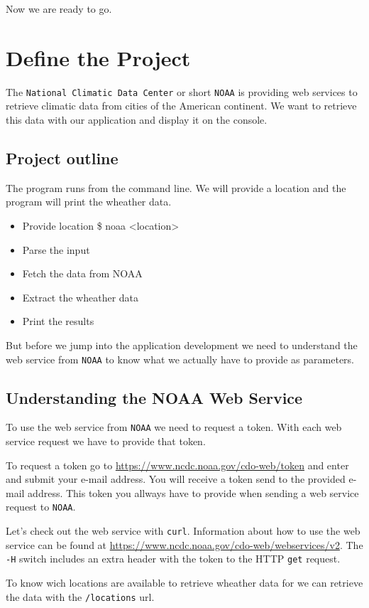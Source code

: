 \documentclass[10pt, a4paper]{article}
\begin{document}
Now we are ready to go.

\section{Define the Project}
The \texttt{National Climatic Data Center} or short \texttt{NOAA} is providing
web services to retrieve climatic data from cities of the American continent.
We want to retrieve this data with our application and display it on the
console.

\subsection{Project outline}
The program runs from the command line. We will provide a location and the
program will print the wheather data.

\begin{itemize}
  \item Provide location \$ noaa <location>
  \item Parse the input
  \item Fetch the data from NOAA
  \item Extract the wheather data
  \item Print the results
\end{itemize}

But before we jump into the application development we need to understand the
web service from \texttt{NOAA} to know what we actually have to provide as
parameters.

\subsection{Understanding the NOAA Web Service}
To use the web service from \texttt{NOAA} we need to request a token. With each
web service request we have to provide that token.

To request a token go to \url{https://www.ncdc.noaa.gov/cdo-web/token} and 
enter and submit your e-mail address. You will receive a token send to the 
provided e-mail address. This token you allways have to provide when sending
a web service request to \texttt{NOAA}.

Let's check out the web service with \texttt{curl}. Information about how to use
the web service can be found at 
\url{https://www.ncdc.noaa.gov/cdo-web/webservices/v2}. The \texttt{-H} switch
includes an extra header with the token to the HTTP \texttt{get} request.

To know wich locations are available to retrieve wheather data for we can
retrieve the data with the \texttt{/locations} url.
\end{document}
